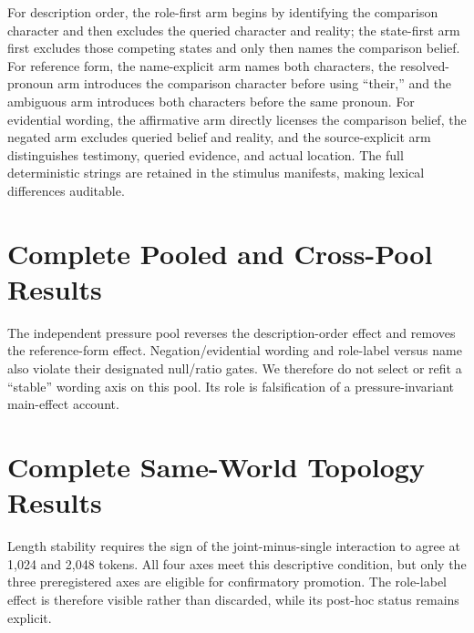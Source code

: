 

For description order, the role-first arm begins by identifying the comparison
character and then excludes the queried character and reality; the state-first
arm first excludes those competing states and only then names the comparison
belief. For reference form, the name-explicit arm names both characters, the
resolved-pronoun arm introduces the comparison character before using
``their,'' and the ambiguous arm introduces both characters before the same
pronoun. For evidential wording, the affirmative arm directly licenses the
comparison belief, the negated arm excludes queried belief and reality, and the
source-explicit arm distinguishes testimony, queried evidence, and actual
location. The full deterministic strings are retained in the stimulus
manifests, making lexical differences auditable.

\section{Complete Pooled and Cross-Pool Results}



The independent pressure pool reverses the description-order effect and removes
the reference-form effect. Negation/evidential wording and role-label versus
name also violate their designated null/ratio gates. We therefore do not select
or refit a ``stable'' wording axis on this pool. Its role is falsification of a
pressure-invariant main-effect account.

\section{Complete Same-World Topology Results}



Length stability requires the sign of the joint-minus-single interaction to
agree at 1,024 and 2,048 tokens. All four axes meet this descriptive condition,
but only the three preregistered axes are eligible for confirmatory promotion.
The role-label effect is therefore visible rather than discarded, while its
post-hoc status remains explicit.

